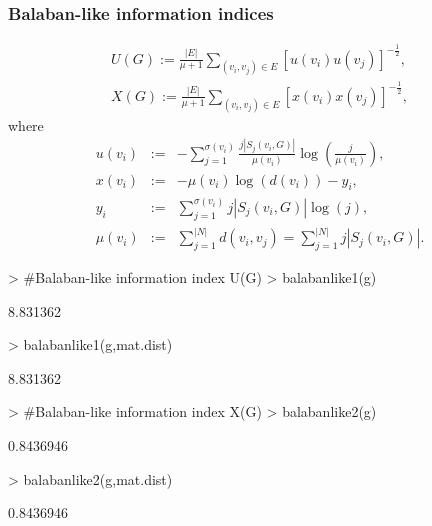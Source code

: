 \documentclass[a4paper]{article}
\begin{document}
\subsubsection*{Balaban-like information indices}
\begin{eqnarray}
U(G):= \frac{|E|}{\mu +1} \sum_{(v_i,v_j) \in E} [u(v_i)u(v_j)]^{- \frac{1}{2}}, \label{eq_balaban_U_index} \\
X(G):= \frac{|E|}{\mu +1} \sum_{(v_i,v_j) \in E} [x(v_i)x(v_j)]^{- \frac{1}{2}}, \label{eq_balaban_X_index}
\end{eqnarray}
%
where
%
\begin{eqnarray}
u(v_i) &:=&  -  \sum_{j=1}^{\sigma(v_i) } \frac{j|S_j(v_i,G)|}{\mu(v_i)} \log\left( \frac{j}{\mu(v_i)} \right), \\
x(v_i) &:=& - \mu(v_i) \log(d(v_i)) - y_i, \\
y_i &:=& \sum_{j=1}^{\sigma(v_i) } j|S_j(v_i,G)| \log(j),\\
\mu(v_i) &:=& \sum_{j=1}^{|N|}d(v_i,v_j) = \sum_{j=1}^{|N|} j|S_j(v_i,G)|.
\end{eqnarray}

\begin{Schunk}
\begin{Sinput}
> #Balaban-like information index U(G)
> balabanlike1(g)
\end{Sinput}
\begin{Soutput}
[1] 8.831362
\end{Soutput}
\begin{Sinput}
> balabanlike1(g,mat.dist)
\end{Sinput}
\begin{Soutput}
[1] 8.831362
\end{Soutput}
\begin{Sinput}
> #Balaban-like information index X(G)
> balabanlike2(g)
\end{Sinput}
\begin{Soutput}
[1] 0.8436946
\end{Soutput}
\begin{Sinput}
> balabanlike2(g,mat.dist)
\end{Sinput}
\begin{Soutput}
[1] 0.8436946
\end{Soutput}
\end{Schunk}
\end{document}
